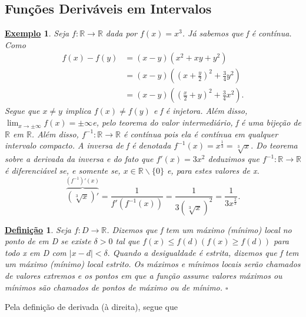 \documentclass{article}
\newtheorem*{def*}{\underline{Defini\c c\~ao}}
\newtheorem{example}{\underline{Exemplo}}
\begin{document}
\subsection{Fun\c cões Deriváveis em Intervalos}
 \begin{example}
   Seja \(f:\mathbb{R}\rightarrow \mathbb{R}\) dada por \(f(x) = x^{3}\). Já 
sabemos que f é contínua. Como 
\begin{align*}
  f(x) - f(y) &=(x-y)(x^{2}+xy+y^{2})\\
              &=(x-y)((x+\frac{y}{2})^{2}+\frac{3}{4}y^{2})\\
              &=(x-y)((\frac{x}{2}+y)^{2}+\frac{3}{4}x^{2}).
\end{align*}
  Segue que \(x\neq y\) implica \(f(x)\neq f(y)\) e f é injetora. Além disso,
\(\lim_{x\to \pm\infty}f(x)=\pm\infty\)e, pelo teorema do valor intermediário,
f é uma bije\c cão de \(\mathbb{R}\) em \(\mathbb{R}\). Além disso,
\(f^{-1}:\mathbb{R}\rightarrow \mathbb{R}\) é contínua pois ela é contínua em
qualquer intervalo compacto. A inversa de f é denotada \(f^{-1}(x) = x^{\frac{1}{3}} = \sqrt[3]{x}.\)
  Do teorema sobre a derivada da inversa e do fato que \(f'(x) = 3x^{2}\) 
deduzimos que \(f^{-1}:\mathbb{R}\rightarrow \mathbb{R}\) é diferenciável se,
e somente se, \(x\in \mathbb{R}\backslash\{0\}\) e, para estes valores de x. 
  \[
    \overbrace{(\sqrt[3]{x})'}^{(f^{-1})'(x)} = \frac{1}{f'(f^{-1}(x))} = \frac{1}{3(\sqrt[3]{x})^{2}} = \frac{1}{3x^{\frac{2}{3}}}.
  \]
\end{example}
 \begin{def*}
   Seja \(f:D\rightarrow \mathbb{R}\). Dizemos que f tem um máximo (mínimo) local no
   ponto de em D se existe \(\delta >0\) tal que \(f(x)\leq f(d) (f(x)\geq f(d))\)
   para todo x em D com \(|x-d| < \delta .\) Quando a desigualdade é estrita,
   dizemos que f tem um máximo (mínimo) local estrito. Os máximos e mínimos locais
   serão chamados de valores extremos e os pontos em que a fun\c cão assume valores máximos
   ou mínimos são chamados de pontos de máximo ou de mínimo. \(\square\)
 \end{def*}
  Pela defini\c cão de derivada (à direita), segue que 
\end{document}
